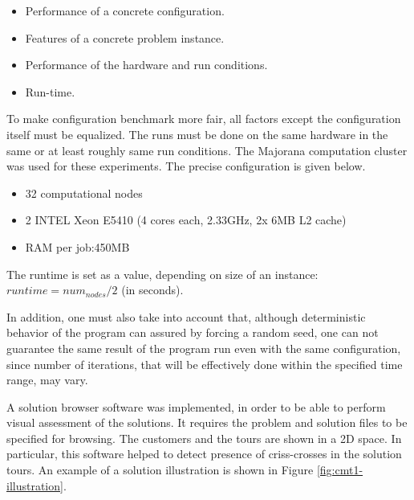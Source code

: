 \documentclass[12pt,a4paper,oneside]{book}
\begin{document}
\begin{itemize}
\item Performance of a concrete configuration.
\item Features of a concrete problem instance.
\item Performance of the hardware and run conditions.
\item Run-time.
\end{itemize}

To make configuration benchmark more fair, all factors except the configuration itself must be equalized. The runs must be done on the same hardware in the same or at least roughly same run conditions. The Majorana computation cluster was used for these experiments. The precise configuration is given below.
\begin{itemize}
\item 32 computational nodes
\item 2 INTEL Xeon E5410 (4 cores each, 2.33GHz, 2x 6MB L2 cache)
\item RAM per job:450MB
\end{itemize}

The runtime is set as a value, depending on size of an instance: $runtime = num_{nodes} / 2$ (in seconds).

In addition, one must also take into account that, although deterministic behavior of the program can assured by forcing a random seed, one can not guarantee the same result of the program run even with the same configuration, since number of iterations, that will be effectively done within the specified time range, may vary.

A solution browser software was implemented, in order to be able to perform visual assessment of the solutions. It requires the problem and solution files to be specified for browsing. The customers and the tours are shown in a 2D space. In particular, this software helped to detect presence of criss-crosses in the solution tours. An example of a solution illustration is shown in Figure \ref{fig:cmt1-illustration}.
\end{document}
